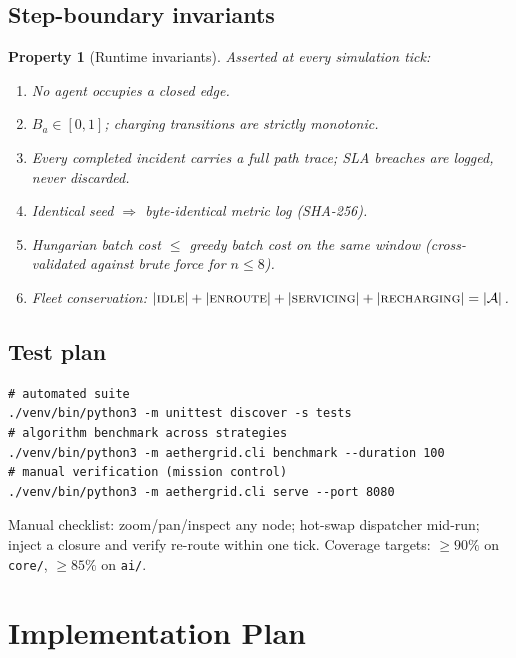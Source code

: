\documentclass[11pt,a4paper]{article}
\theoremstyle{spaceddef}
\theoremstyle{spacedplain}
\newtheorem{property}{Property}[section]
\begin{document}
\subsection{Step-boundary invariants}\label{sec:inv}
\begin{property}[Runtime invariants]\label{prop:inv}
Asserted at every simulation tick:
\begin{enumerate}[leftmargin=2em,itemsep=2pt,label=\textbf{I\arabic*.}]
  \item No agent occupies a closed edge.
  \item $B_a\in[0,1]$; charging transitions are strictly monotonic.
  \item Every completed incident carries a full path trace; SLA breaches are logged, never discarded.
  \item Identical seed $\Rightarrow$ byte-identical metric log (SHA-256).
  \item Hungarian batch cost $\le$ greedy batch cost on the same window
        (cross-validated against brute force for $n\le8$).
  \item Fleet conservation: $|\textsc{idle}|+|\textsc{enroute}|+|\textsc{servicing}|
        +|\textsc{recharging}|=|\mathcal{A}|$.
\end{enumerate}
\end{property}

\subsection{Test plan}
{\small\begin{verbatim}
# automated suite
./venv/bin/python3 -m unittest discover -s tests
# algorithm benchmark across strategies
./venv/bin/python3 -m aethergrid.cli benchmark --duration 100
# manual verification (mission control)
./venv/bin/python3 -m aethergrid.cli serve --port 8080
\end{verbatim}}
Manual checklist: zoom/pan/inspect any node; hot-swap dispatcher mid-run;
inject a closure and verify re-route within one tick.
Coverage targets: $\ge90\%$ on \texttt{core/}, $\ge85\%$ on \texttt{ai/}.

\section{Implementation Plan}\label{sec:plan}
\end{document}
